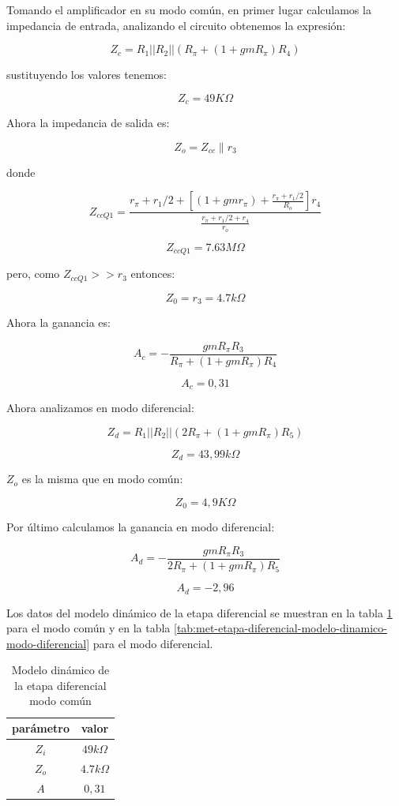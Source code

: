Tomando el amplificador en su modo común, en primer lugar calculamos la impedancia de entrada, analizando el circuito obtenemos la expresión:

$$ Z_c = R_1 || R_2 || (R_\pi + (1 + gmR_\pi)R_4)$$

sustituyendo los valores tenemos:

$$ Z_c = 49K\Omega$$

Ahora la impedancia de salida es:

$$ Z_o = Z_{cc} \parallel r_3$$

donde

$$ Z_{ccQ1} = \frac{r_\pi + r_1/2 + [(1 + gmr_\pi) + \frac{r_\pi + r_1/2}{R_o}] r_4}{\frac{r_\pi + r_1/2 + r_4}{r_o}}$$

$$ Z_{ccQ1} = 7.63 M\Omega$$

pero, como $Z_{ccQ1} >> r_3$ entonces:

$$ Z_0 = r_3 = 4.7k\Omega$$

Ahora la ganancia es:

$$A_c = - \frac{ gmR_\pi R_3}{R_\pi + (1 + gmR_\pi)R_4}$$

$$A_c = 0,31$$

Ahora analizamos en modo diferencial:

$$Z_d = R_1 || R_2 || (2R_\pi + (1+gmR_\pi )R_5)$$

$$Z_d = 43,99 k\Omega$$

$Z_o$ es la misma que en modo común:

$$Z_0 = 4,9 K\Omega$$

Por último calculamos la ganancia en modo diferencial:

$$A_d = -\frac{gmR_\pi R_3}{2R_\pi + (1 + gmR_\pi) R_5}$$

$$A_d = -2,96 $$

Los datos del modelo dinámico de la etapa diferencial se muestran en la tabla \ref{tab:met-etapa-diferencial-modelo-dinamico-modo-comun} para el modo común y en la tabla \ref{tab:met-etapa-diferencial-modelo-dinamico-modo-diferencial} para el modo diferencial.

\begin{table}[ht]
    \centering
    \begin{tabular}{|c|c|}
        \hline
        parámetro & valor  \\
        \hline
        $Z_i$ & $49k\Omega$ \\
        \hline
        $Z_o$ & $4.7k\Omega$ \\
        \hline
        $A$ & $0,31$ \\
        \hline
    \end{tabular}
    \caption{Modelo dinámico de la etapa diferencial modo común}
    \label{tab:met-etapa-diferencial-modelo-dinamico-modo-comun}
\end{table}


